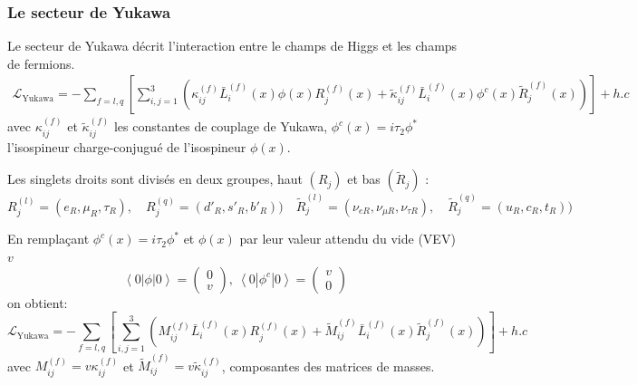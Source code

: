 \subsubsection{Le secteur de Yukawa}
Le secteur de Yukawa décrit l'interaction entre le champs de Higgs et les champs de fermions.
\begin{equation}
\begin{split}
\mathcal{L}_{\mathrm{Yukawa}}=-\sum_{f=l,q}\left[\sum_{i,j=1}^{3}\left(\kappa_{ij}^{(f)}\bar{L}_{i}^{(f)}(x)\phi(x)R_{j}^{(f)}(x)+\tilde{\kappa}_{ij}^{(f)}\bar{L}_{i}^{(f)}(x)\phi^{c}(x)\tilde{R}_{j}^{(f)}(x)\right)\right]+ h.c
\end{split}
\end{equation} 
avec $\kappa_{ij}^{(f)}$ et $\tilde{\kappa}_{ij}^{(f)}$ les constantes de couplage de Yukawa, $\phi^{c}(x)=i\tau_{2}\phi^{*}$ l'isospineur charge-conjugué de l'isospineur $\phi(x)$.

Les singlets droits sont divisés en deux groupes, haut $\left(R_{j}\right)$ et bas $\left(\tilde{R}_{j}\right)$ :
\begin{equation}
R_j^{(l)}=\left(e_{R},\mu_{R},\tau_{R}\right),\quad R_j^{(q)}=\left(d'_{R},s'_{R},b'_{R}\right)) \quad \tilde{R}_j^{(l)}=\left(\nu_{eR},\nu_{\mu R},\nu_{\tau R}\right),\quad \tilde{R}_j^{(q)}=\left(u_{R},c_{R},t_{R}\right))
\end{equation} 

En remplaçant $\phi^{c}(x)=i\tau_{2}\phi^{*}$ et $\phi(x)$ par leur valeur attendu du vide (VEV) $v$
\begin{equation}
\left<0\left|\phi \right|0\right>=\begin{pmatrix} 0\\v\end{pmatrix},\ \left<0\left|\phi^{c} \right|0\right>=\begin{pmatrix} v\\ 0\end{pmatrix}
\end{equation} on obtient:
\begin{equation}
\mathcal{L}_{\mathrm{Yukawa}}=-\sum_{f=l,q}\left[\sum_{i,j=1}^{3}\left(M^{(f)}_{ij}\bar{L}_{i}^{(f)}(x)R_{j}^{(f)}(x)+\tilde{M}^{(f)}_{ij}\bar{L}_{i}^{(f)}(x)\tilde{R}_{j}^{(f)}(x)\right)\right]+ h.c
\end{equation} 
avec $M^{(f)}_{ij}=v\kappa_{ij}^{(f)}$ et $\tilde{M}^{(f)}_{ij}=v\tilde{\kappa}_{ij}^{(f)}$, composantes des matrices de masses.

